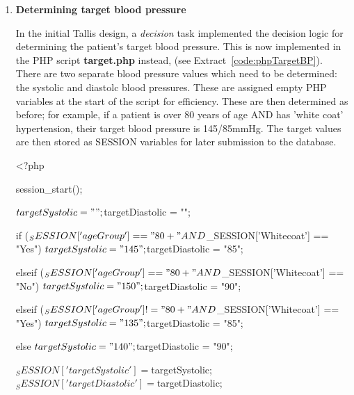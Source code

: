 \documentclass[11pt]{article}
\begin{document}
\begin{enumerate}
\begin{code}[ht]
\caption{PHP - storing form data as session variables}
\label{code:phpSession}
\end{code}


\item \textbf{Determining target blood pressure}

In the initial Tallis design, a \textit{decision} task implemented the decision logic for determining the patient's target blood pressure. This is now implemented in the PHP script \textbf{target.php} instead, (see Extract~\ref{code:phpTargetBP}). There are two separate blood pressure values which need to be determined: the systolic and diastolc blood pressures. These are assigned empty PHP variables at the start of the script for efficiency. These are then determined as before; for example, if a patient is over 80 years of age AND has 'white coat' hypertension, their target blood pressure is 145/85mmHg. The target values are then stored as SESSION variables for later submission to the database. 


\begin{code}[ht]
\begin{php}
<?php

session_start();

$targetSystolic = "";
$targetDiastolic = "";

if ($_SESSION['ageGroup'] == "80+" AND $_SESSION['Whitecoat'] == "Yes")
{
$targetSystolic = "145";
$targetDiastolic = "85";
}

elseif ($_SESSION['ageGroup'] == "80+" AND $_SESSION['Whitecoat'] == "No")
{
$targetSystolic = "150";
$targetDiastolic = "90";
}


elseif ($_SESSION['ageGroup'] != "80+" AND $_SESSION['Whitecoat'] == "Yes")
{
$targetSystolic = "135";
$targetDiastolic = "85";
}

else
{
$targetSystolic = "140";
$targetDiastolic = "90";
}

$_SESSION['targetSystolic'] = $targetSystolic;
$_SESSION['targetDiastolic'] = $targetDiastolic;


\end{php}
\end{code}
\end{enumerate}
\end{document}
